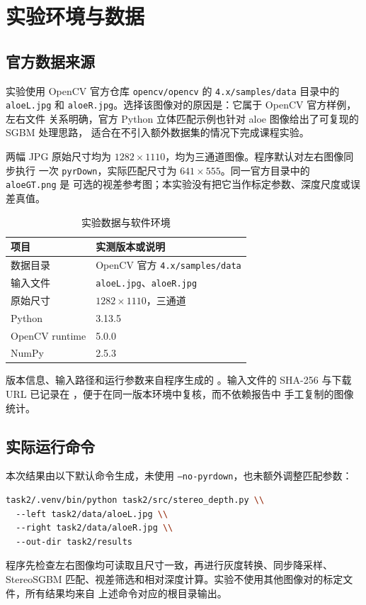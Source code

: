 \section{实验环境与数据}

\subsection{官方数据来源}

实验使用 OpenCV 官方仓库 \texttt{opencv/opencv} 的 \texttt{4.x/samples/data} 目录中的
\texttt{aloeL.jpg} 和 \texttt{aloeR.jpg}。选择该图像对的原因是：它属于 OpenCV 官方样例，左右文件
关系明确，官方 Python 立体匹配示例也针对 aloe 图像给出了可复现的 SGBM 处理思路，
适合在不引入额外数据集的情况下完成课程实验。

两幅 JPG 原始尺寸均为 $1282\times1110$，均为三通道图像。程序默认对左右图像同步执行
一次 \texttt{pyrDown}，实际匹配尺寸为 $641\times555$。同一官方目录中的 \texttt{aloeGT.png} 是
可选的视差参考图；本实验没有把它当作标定参数、深度尺度或误差真值。

\begin{table}[H]
  \centering
  \caption{实验数据与软件环境}
  \label{tab:environment}
  \begin{tabular}{ll}
    \toprule
    项目 & 实测版本或说明 \\
    \midrule
    数据目录 & OpenCV 官方 \texttt{4.x/samples/data} \\
    输入文件 & \texttt{aloeL.jpg}、\texttt{aloeR.jpg} \\
    原始尺寸 & $1282\times1110$，三通道 \\
    Python & 3.13.5 \\
    OpenCV runtime & 5.0.0 \\
    NumPy & 2.5.3 \\
    \bottomrule
  \end{tabular}
\end{table}

版本信息、输入路径和运行参数来自程序生成的
。输入文件的 SHA-256 与下载 URL 已记录在
，便于在同一版本环境中复核，而不依赖报告中
手工复制的图像统计。

\subsection{实际运行命令}

本次结果由以下默认命令生成，未使用 \texttt{--no-pyrdown}，也未额外调整匹配参数：

\begin{lstlisting}[language=bash]
task2/.venv/bin/python task2/src/stereo_depth.py \\
  --left task2/data/aloeL.jpg \\
  --right task2/data/aloeR.jpg \\
  --out-dir task2/results
\end{lstlisting}

程序先检查左右图像均可读取且尺寸一致，再进行灰度转换、同步降采样、StereoSGBM
匹配、视差筛选和相对深度计算。实验不使用其他图像对的标定文件，所有结果均来自
上述命令对应的根目录输出。
